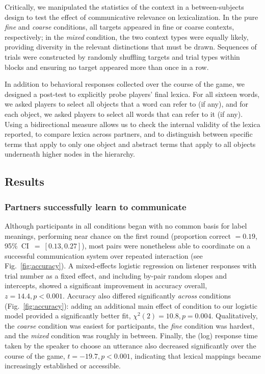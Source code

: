 \documentclass[10pt,letterpaper]{article}
\begin{document}
Critically, we manipulated the statistics of the context in a between-subjects design to test the effect of communicative relevance on lexicalization. In the pure \emph{fine} and \emph{coarse} conditions, all targets appeared in fine or coarse contexts, respectively; in the \emph{mixed} condition, the two context types were equally likely, providing diversity in the relevant distinctions that must be drawn. Sequences of trials were constructed by randomly shuffling targets and trial types within blocks and ensuring no target appeared more than once in a row. 

In addition to behavioral responses collected over the course of the game, we designed a post-test to explicitly probe players' final lexica. For all sixteen words, we asked players to select all objects that a word can refer to (if any), and for each object, we asked players to select all words that can refer to it (if any). Using a bidirectional measure allows us to check the internal validity of the lexica reported, to compare lexica across partners, and to distinguish between specific terms that apply to only one object and abstract terms that apply to all objects underneath higher nodes in the hierarchy. 

\subsection{Results}

\subsubsection{Partners successfully learn to communicate}

Although participants in all conditions began with no common basis for label meanings, performing near chance on the first round (proportion correct $= 0.19$, 95\%~CI~$=~[0.13, 0.27]$), most pairs were nonetheless able to coordinate on a successful communication system over repeated interaction (see Fig.\ \ref{fig:accuracy}). 
A mixed-effects logistic regression on listener responses with trial number as a fixed effect, and including by-pair random slopes and intercepts, showed a significant improvement in accuracy overall, $z = 14.4, p < 0.001$. 
Accuracy also differed significantly \emph{across} conditions (Fig.\ \ref{fig:accuracy}): adding an additional main effect of condition to our logistic model provided a significantly better fit, $\chi^2(2) = 10.8, p = 0.004$. 
Qualitatively, the \emph{coarse} condition was easiest for participants, the \emph{fine} condition was hardest, and the \emph{mixed} condition was roughly in between. %
Finally, the (log) response time taken by the speaker to choose an utterance also decreased significantly over the course of the game, $t = -19.7, p < 0.001$, indicating that lexical mappings became increasingly established or accessible.
\end{document}
